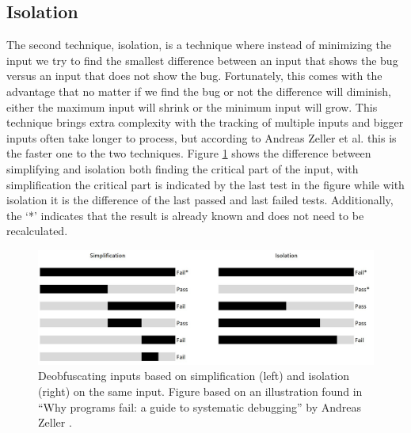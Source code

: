 \subsection{Isolation}
\label{inputReduction:Isolation}
The second technique, isolation, is a technique where instead of minimizing the input we try to find the smallest difference between an input that shows the bug versus an input that does not show the bug. Fortunately, this comes with the advantage that no matter if we find the bug or not the difference will diminish, either the maximum input will shrink or the minimum input will grow. 
This technique brings extra complexity with the tracking of multiple inputs and bigger inputs often take longer to process, but according to Andreas Zeller et al. \cite{5zeller2002simplifyingIsolatingFailure-inducing} this is the faster one to the two techniques. 
Figure \ref{fig:simplificationIsolation} shows the difference between simplifying and isolation both finding the critical part of the input, with simplification the critical part is indicated by the last test in the figure while with isolation it is the difference of the last passed and last failed tests. Additionally, the ‘*’ indicates that the result is already known and does not need to be recalculated.
\begin{figure}
	\centering
	\includegraphics[width=1.0\textwidth]{images/simplificationIsolation}
	\caption{Deobfuscating inputs based on simplification (left) and isolation (right) on the same input. Figure based on an illustration found in “Why programs fail: a guide to systematic debugging” by Andreas Zeller \cite{bookZellerwhyProgramsFail}.}
	\label{fig:simplificationIsolation}
\end{figure}

